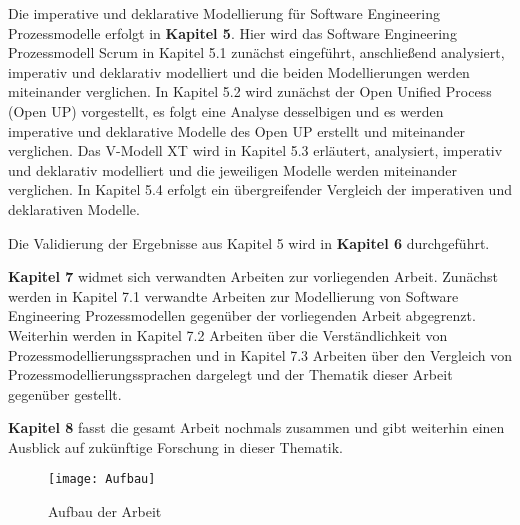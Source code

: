 Die imperative und deklarative Modellierung für Software Engineering Prozessmodelle erfolgt in \textbf{Kapitel 5}. Hier wird das Software Engineering Prozessmodell Scrum in Kapitel 5.1 zunächst eingeführt, anschließend analysiert, imperativ und deklarativ modelliert und die beiden Modellierungen werden miteinander verglichen. In Kapitel 5.2 wird zunächst der Open Unified Process (Open UP) vorgestellt, es folgt eine Analyse desselbigen und es werden imperative und deklarative Modelle des Open UP erstellt und miteinander verglichen. Das V-Modell XT wird in Kapitel 5.3 erläutert, analysiert, imperativ und deklarativ modelliert und die jeweiligen Modelle werden miteinander verglichen. In Kapitel 5.4 erfolgt ein übergreifender Vergleich der imperativen und deklarativen Modelle.\newline

Die Validierung der Ergebnisse aus Kapitel 5 wird in \textbf{Kapitel 6} durchgeführt. \newline

\textbf {Kapitel 7} widmet sich verwandten Arbeiten zur vorliegenden Arbeit. Zunächst werden in Kapitel 7.1 verwandte Arbeiten zur Modellierung von Software Engineering Prozessmodellen gegenüber der vorliegenden Arbeit abgegrenzt. Weiterhin werden in Kapitel 7.2 Arbeiten über die Verständlichkeit von Prozessmodellierungssprachen und in Kapitel 7.3 Arbeiten über den Vergleich von Prozessmodellierungssprachen dargelegt und der Thematik dieser Arbeit gegenüber gestellt.\newline

\textbf{Kapitel 8} fasst die gesamt Arbeit nochmals zusammen und gibt weiterhin einen Ausblick auf zukünftige Forschung in dieser Thematik.

\begin{figure}[htp]
\begin{center}
  \texttt{[image: Aufbau]} %
  \caption{Aufbau der Arbeit}
  \label{fig:Aufbau}
\end{center}
\end{figure}


